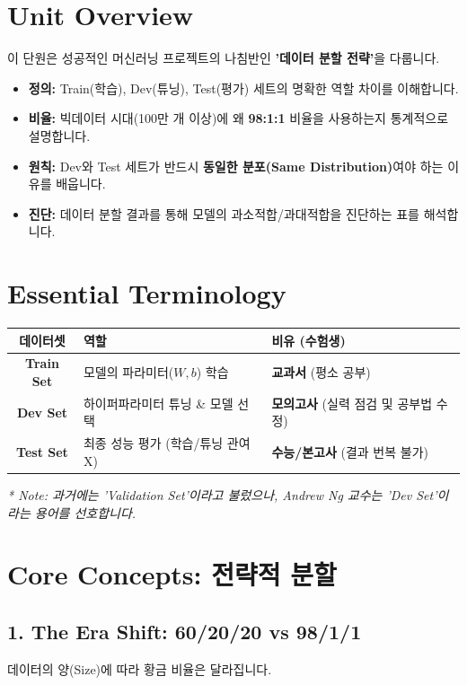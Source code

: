 \documentclass[11pt,a4paper]{book}
\theoremstyle{definition}
\begin{document}
\section{Unit Overview}
\begin{summarybox}[title={핵심 목표}]
이 단원은 성공적인 머신러닝 프로젝트의 나침반인 \textbf{'데이터 분할 전략'}을 다룹니다.
\begin{itemize}
    \item \textbf{정의:} Train(학습), Dev(튜닝), Test(평가) 세트의 명확한 역할 차이를 이해합니다.
    \item \textbf{비율:} 빅데이터 시대(100만 개 이상)에 왜 \textbf{98:1:1} 비율을 사용하는지 통계적으로 설명합니다.
    \item \textbf{원칙:} Dev와 Test 세트가 반드시 \textbf{동일한 분포(Same Distribution)}여야 하는 이유를 배웁니다.
    \item \textbf{진단:} 데이터 분할 결과를 통해 모델의 과소적합/과대적합을 진단하는 표를 해석합니다.
\end{itemize}
\end{summarybox}

\section{Essential Terminology}
\begin{center}
\begin{tabular}{|c|l|l|}
\hline
\textbf{데이터셋} & \textbf{역할} & \textbf{비유 (수험생)} \\ \hline
\textbf{Train Set} & 모델의 파라미터($W, b$) 학습 & \textbf{교과서} (평소 공부) \\ \hline
\textbf{Dev Set} & 하이퍼파라미터 튜닝 \& 모델 선택 & \textbf{모의고사} (실력 점검 및 공부법 수정) \\ \hline
\textbf{Test Set} & 최종 성능 평가 (학습/튜닝 관여 X) & \textbf{수능/본고사} (결과 번복 불가) \\ \hline
\end{tabular}
\end{center}
\textit{* Note: 과거에는 'Validation Set'이라고 불렀으나, Andrew Ng 교수는 'Dev Set'이라는 용어를 선호합니다.}

\section{Core Concepts: 전략적 분할}

\subsection{1. The Era Shift: 60/20/20 vs 98/1/1}
데이터의 양(Size)에 따라 황금 비율은 달라집니다.
\end{document}
